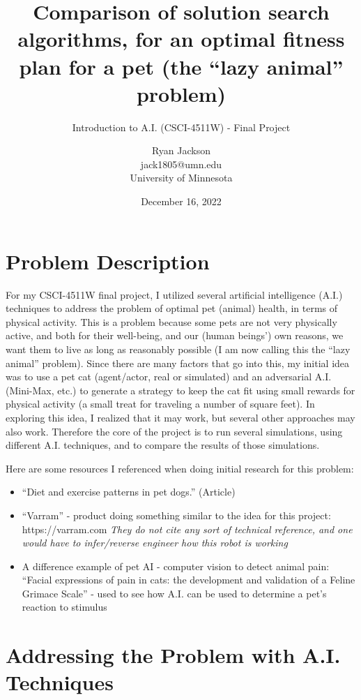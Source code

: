 \documentclass{article}
\title{Comparison of solution search algorithms, for an optimal fitness plan for a pet (the ``lazy animal'' problem)}
\subtitle{Introduction to A.I. (CSCI-4511W) - Final Project}
\author{Ryan Jackson \\ jack1805@umn.edu \\ University of Minnesota}
\date{December 16, 2022}
\begin{document}
\maketitle

\section{Problem Description}

For my CSCI-4511W final project, I utilized several artificial intelligence (A.I.) techniques to address the problem of optimal pet (animal) health, in terms of physical activity. This is a problem because some pets are not very physically active, and both for their well-being, and our (human beings') own reasons, we want them to live as long as reasonably possible (I am now calling this the ``lazy animal'' problem). Since there are many factors that go into this, my initial idea was to use a pet cat (agent/actor, real or simulated) and an adversarial A.I. (Mini-Max, etc.) to generate a strategy to keep the cat fit using small rewards for physical activity (a small treat for traveling a number of square feet). In exploring this idea, I realized that it may work, but several other approaches may also work. Therefore the core of the project is to run several simulations, using different A.I. techniques, and to compare the results of those simulations.

Here are some resources I referenced when doing initial research for this problem:
\begin{itemize}
    \item ``Diet and exercise patterns in pet dogs.'' (Article) \cite{slater1995diet}
    \item ``Varram'' - product doing something similar to the idea for this project: https://varram.com \cite{varram}
    \textit{They do not cite any sort of technical reference, and one would have to infer/reverse engineer how this robot is working}
    \item A difference example of pet AI - computer vision to detect animal pain: ``Facial expressions of pain in cats: the development and validation of a Feline Grimace Scale'' - used to see how A.I. can be used to determine a pet's reaction to stimulus  \cite{evangelista2019}
\end{itemize}

\section{Addressing the Problem with A.I. Techniques}
\end{document}
